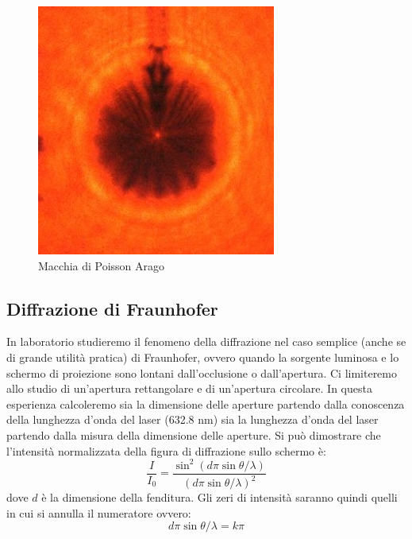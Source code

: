 \documentclass[a4paper,10pt,oneside]{article}
\begin{document}
\begin{figure}[H]
 \centering
 \includegraphics[width=0.7\textwidth]{./Immagini/poisson_spot3.jpg}
 \caption{Macchia di Poisson Arago}
 \label{fig:poisson_arago}
\end{figure}


\subsection{Diffrazione di Fraunhofer}

In laboratorio studieremo il fenomeno della diffrazione nel caso semplice (anche se di grande utilità pratica) di Fraunhofer, ovvero quando la sorgente luminosa e lo schermo di proiezione sono lontani dall'occlusione o dall'apertura. Ci limiteremo allo studio di un'apertura rettangolare e di un'apertura circolare. In questa esperienza calcoleremo sia la dimensione delle aperture partendo dalla conoscenza della lunghezza d'onda del laser (632.8 nm) sia la lunghezza d'onda del laser partendo dalla misura della dimensione delle aperture.  Si può dimostrare che l'intensità normalizzata della figura di diffrazione sullo schermo è:
\begin{equation}
 \frac{I}{I_0}=\frac{\sin^2(d\pi\sin\theta/\lambda) }{(d\pi\sin\theta/\lambda)^2}
\end{equation}
dove $d$ è la dimensione della fenditura. Gli zeri di intensità saranno quindi quelli in cui si annulla il numeratore ovvero:
\begin{equation}
 d\pi\sin\theta/\lambda=k\pi
\end{equation}
\end{document}
